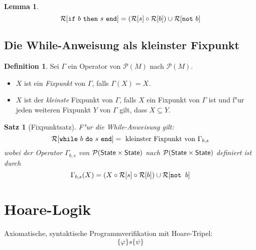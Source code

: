 \documentclass[german,10pt, a4paper, twocolumn]{scrartcl}
\newtheorem{lemma}{Lemma}[section]
\newtheorem{satz}{Satz}[section]
\theoremstyle{definition}
\newtheorem{definition}{Definition}[section]
\theoremstyle{remark}
\begin{document}
\begin{lemma}
	\small
	\begin{displaymath}
		\mathcal{R}[\mbox{\tt if}\ b\ \mbox{\tt then}\ s\ \mbox{\tt end}] = (\mathcal{R}[s]\circ \mathcal{R}[b])\cup \mathcal{R}[\mbox{\tt not}\ b]
	\end{displaymath}
	\normalsize
\end{lemma}

\subsection{Die While-Anweisung als kleinster Fixpunkt}

\begin{definition}
	Sei $\Gamma$ ein Operator von $\mathcal{P}(M)$ nach $\mathcal{P}(M)$.
	\begin{itemize}
		\item $X$ ist ein \textit{Fixpunkt} von $\Gamma$, falls $\Gamma(X)=X$.
		\item $X$ ist der \textit{kleinste} Fixpunkt von $\Gamma$, falls $X$ ein Fixpunkt von $\Gamma$ ist und f"ur jeden weiteren Fixpunkt $Y$ von $\Gamma$ gilt, dass $X\subseteq Y$.
	\end{itemize}
\end{definition}

\begin{satz}[Fixpunktsatz] F"ur die While-Anweisung gilt:
\begin{displaymath}
	\mathcal{R}[\mbox{\tt while}\ b\ \mbox{\tt do}\ s\ \mbox{\tt end}] = \mbox{ kleinster Fixpunkt von } \Gamma_{b,s}
\end{displaymath}
wobei der Operator $\Gamma_{b,s}$ von $\mathcal{P}(\mbox{\sf State}\times \mbox{\sf State})$ nach $\mathcal{P}(\mbox{\sf State}\times \mbox{\sf State})$ definiert ist durch
\begin{displaymath}
	\Gamma_{b,s}(X) = (X \circ \mathcal{R}[s]\circ \mathcal{R}[b])\cup \mathcal{R}[\mbox{\tt not } b]
\end{displaymath}
\end{satz}

\section{Hoare-Logik}

Axiomatische, syntaktische Programmverifikation mit Hoare-Tripel:
\begin{displaymath}
	\{  \varphi \} s \{ \psi \}
\end{displaymath}
\end{document}
